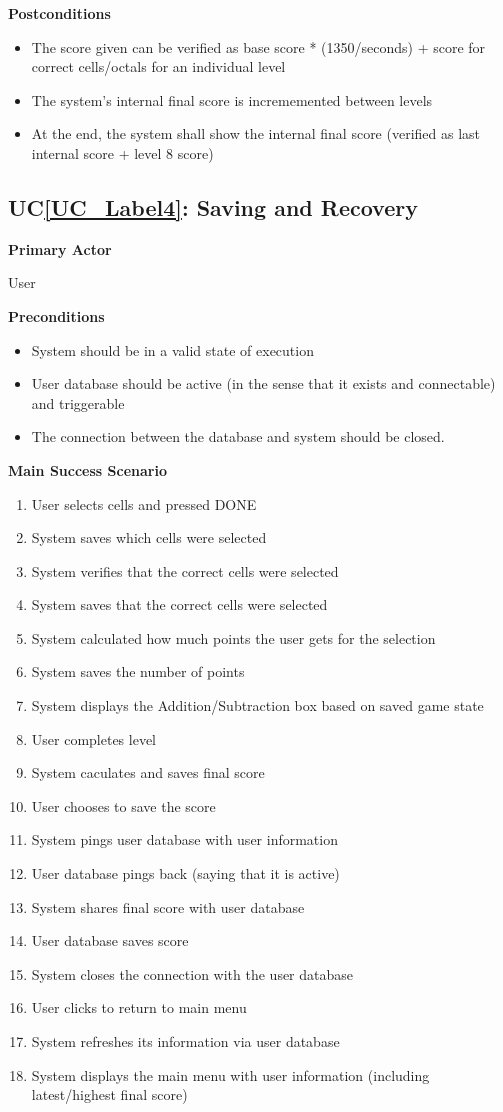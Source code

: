 \documentclass[12pt]{article}
\newcounter{ucnum} %
\newcommand{\ucref}[1]{UC\ref{#1}}
\begin{document}
\textbf{Postconditions}
\begin{itemize}
\item The score given can be verified as base score * (1350/seconds) + score for correct cells/octals for an individual level
\item The system's internal final score is incrememented between levels
\item At the end, the system shall show the internal final score (verified as last internal score + level 8 score)
\end{itemize}

 \label{UC_Label4}
\subsection{\ucref{UC_Label4}: Saving and Recovery}

\textbf{Primary Actor}

User

\textbf{Preconditions}
\begin{itemize}
\item System should be in a valid state of execution
\item User database should be active (in the sense that it exists and connectable) and triggerable
\item The connection between the database and system should be closed.
\end{itemize}

\textbf{Main Success Scenario}
\begin{enumerate}
\item User selects cells and pressed DONE
\item System saves which cells were selected
\item System verifies that the correct cells were selected
\item System saves that the correct cells were selected
\item System calculated how much points the user gets for the selection 
\item System saves the number of points
\item System displays the Addition/Subtraction box based on saved game state
\item User completes level
\item System caculates and saves final score
\item User chooses to save the score
\item System pings user database with user information
\item User database pings back (saying that it is active)
\item System shares final score with user database
\item User database saves score
\item System closes the connection with the user database
\item User clicks to return to main menu 
\item System refreshes its information via user database
\item System displays the main menu with user information (including latest/highest final score) 
\end{enumerate}
\end{document}
